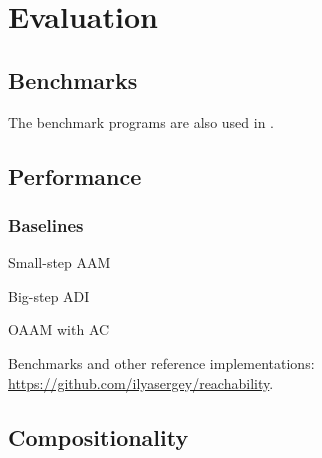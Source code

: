 \section{Evaluation}

\subsection{Benchmarks}

The benchmark programs are also used in \cite{Johnson:2013:OAA:2500365.2500604, ashley:practical}.

\subsection{Performance}

\subsubsection{Baselines}
Small-step AAM

Big-step ADI

OAAM with AC \cite{Boucher:1996:ACN:647473.727587, Johnson:2013:OAA:2500365.2500604}

Benchmarks and other reference implementations: \url{https://github.com/ilyasergey/reachability}.

\subsection{Compositionality}

